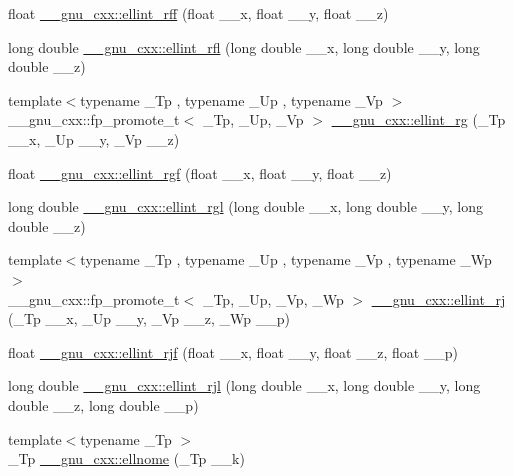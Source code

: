 \begin{DoxyCompactItemize}
float \hyperlink{group__gnu__math__spec__func_ga39acf5c69a85f9b687478b32847156da}{\+\_\+\+\_\+gnu\+\_\+cxx\+::ellint\+\_\+rff} (float \+\_\+\+\_\+x, float \+\_\+\+\_\+y, float \+\_\+\+\_\+z)
\item 
long double \hyperlink{group__gnu__math__spec__func_ga38dd36b3db5bbe5da516d0cbe3ff1f21}{\+\_\+\+\_\+gnu\+\_\+cxx\+::ellint\+\_\+rfl} (long double \+\_\+\+\_\+x, long double \+\_\+\+\_\+y, long double \+\_\+\+\_\+z)
\item 
{\footnotesize template$<$typename \+\_\+\+Tp , typename \+\_\+\+Up , typename \+\_\+\+Vp $>$ }\\\+\_\+\+\_\+gnu\+\_\+cxx\+::fp\+\_\+promote\+\_\+t$<$ \+\_\+\+Tp, \+\_\+\+Up, \+\_\+\+Vp $>$ \hyperlink{group__gnu__math__spec__func_gadf618529d6106c1c1bc1e9212c4fed12}{\+\_\+\+\_\+gnu\+\_\+cxx\+::ellint\+\_\+rg} (\+\_\+\+Tp \+\_\+\+\_\+x, \+\_\+\+Up \+\_\+\+\_\+y, \+\_\+\+Vp \+\_\+\+\_\+z)
\item 
float \hyperlink{group__gnu__math__spec__func_ga7a4ab348bf312a3425501ac8a3d16494}{\+\_\+\+\_\+gnu\+\_\+cxx\+::ellint\+\_\+rgf} (float \+\_\+\+\_\+x, float \+\_\+\+\_\+y, float \+\_\+\+\_\+z)
\item 
long double \hyperlink{group__gnu__math__spec__func_ga563455d515ed845988552432108a21be}{\+\_\+\+\_\+gnu\+\_\+cxx\+::ellint\+\_\+rgl} (long double \+\_\+\+\_\+x, long double \+\_\+\+\_\+y, long double \+\_\+\+\_\+z)
\item 
{\footnotesize template$<$typename \+\_\+\+Tp , typename \+\_\+\+Up , typename \+\_\+\+Vp , typename \+\_\+\+Wp $>$ }\\\+\_\+\+\_\+gnu\+\_\+cxx\+::fp\+\_\+promote\+\_\+t$<$ \+\_\+\+Tp, \+\_\+\+Up, \+\_\+\+Vp, \+\_\+\+Wp $>$ \hyperlink{group__gnu__math__spec__func_gadccabc8df929cc03745286ed1574a3ba}{\+\_\+\+\_\+gnu\+\_\+cxx\+::ellint\+\_\+rj} (\+\_\+\+Tp \+\_\+\+\_\+x, \+\_\+\+Up \+\_\+\+\_\+y, \+\_\+\+Vp \+\_\+\+\_\+z, \+\_\+\+Wp \+\_\+\+\_\+p)
\item 
float \hyperlink{group__gnu__math__spec__func_gace85b5190b04f57493878c5d672cfabd}{\+\_\+\+\_\+gnu\+\_\+cxx\+::ellint\+\_\+rjf} (float \+\_\+\+\_\+x, float \+\_\+\+\_\+y, float \+\_\+\+\_\+z, float \+\_\+\+\_\+p)
\item 
long double \hyperlink{group__gnu__math__spec__func_gab5405f1669b3ce8b560dc33aa5b97287}{\+\_\+\+\_\+gnu\+\_\+cxx\+::ellint\+\_\+rjl} (long double \+\_\+\+\_\+x, long double \+\_\+\+\_\+y, long double \+\_\+\+\_\+z, long double \+\_\+\+\_\+p)
\item 
{\footnotesize template$<$typename \+\_\+\+Tp $>$ }\\\+\_\+\+Tp \hyperlink{group__gnu__math__spec__func_ga7bfb34f8b5c0ed7c72040f9cb7034bba}{\+\_\+\+\_\+gnu\+\_\+cxx\+::ellnome} (\+\_\+\+Tp \+\_\+\+\_\+k)

\end{DoxyCompactItemize}
